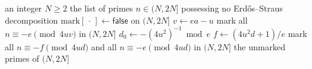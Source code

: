 \documentclass[11pt, a4paper]{article}
\theoremstyle{plain}
\theoremstyle{definition}
\begin{document}
\begin{algorithm}[H]
\caption{Complete batch decision on $[N,2N]$} \label{alg:batch_complete}
\begin{algorithmic}[1]
\Require an integer $N\ge2$
\Ensure the list of primes $n\in(N,2N]$ possessing no Erd\H{o}s--Straus decomposition
\State $\mathrm{mark}[\,\cdot\,]\gets \textsf{false}$ on $(N,2N]$
            \State $v\gets ea-u$ 
            \State mark all $n\equiv -e \pmod{4uv}$ in $(N,2N]$
        \EndFor
    \EndFor
\EndFor
{}
        \State $d_0\gets -(4u^{2})^{-1}\bmod e$
            \State $f\gets (4u^{2}d+1)/e$
            \State mark all $n\equiv-f \pmod{4ud}$ and all $n\equiv -e\pmod{4ud}$ in $(N,2N]$
        \EndFor
    \EndFor
\EndFor
\State \Return the unmarked primes of $(N,2N]$
\end{algorithmic}
\end{algorithm}
\end{document}
